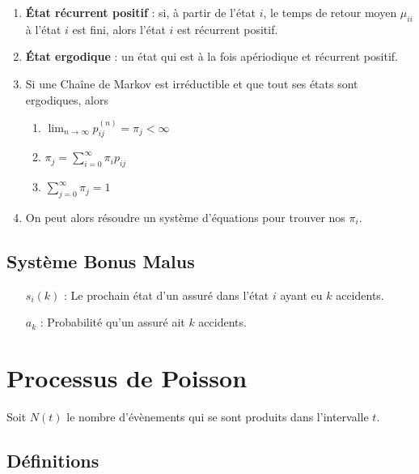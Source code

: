 \documentclass[10pt, french, landscape]{article}
\begin{document}
\begin{multicols*}{2}
\begin{enumerate}[label=\faAngleRight]
\item \textbf{État récurrent positif} : si, à partir de l'état $i$, le temps de retour moyen $\mu_{ii}$ à l'état $i$ est fini, alors l'état $i$ est récurrent positif.

\item \textbf{État ergodique} : un état qui est à la fois apériodique et récurrent positif.

\item Si une Chaîne de Markov est irréductible et que tout ses états sont ergodiques, alors
\begin{enumerate}[label=(\arabic*)]
	\item $	\lim_{n \to \infty} p_{ij}^{(n)} = \pi_j < \infty$
	\item $\pi_j = \sum_{i=0}^{\infty} \pi_i p_{ij}$
	\item $\sum_{j=0}^{\infty} \pi_j = 1$
\end{enumerate}

\item On peut alors résoudre un système d'équations pour trouver nos $\pi_i$.
\end{enumerate}

\subsection*{Système Bonus Malus}

\begin{enumerate}
	\item[$s_{i}(k)$ : ] Le prochain état d'un assuré dans l'état $i$ ayant eu $k$ accidents.
	\item[$a_{k}$ : ] Probabilité qu'un assuré ait $k$ accidents.
\end{enumerate}

\section{Processus de Poisson}
Soit $N(t)$ le nombre d'évènements qui se sont produits dans l'intervalle $t$.

\subsection*{Définitions}


\end{multicols*}
\end{document}
